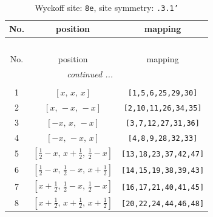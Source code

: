 \documentclass[fleqn,8pt]{jsarticle}
\begin{document}
\begin{longtable}{ccc}
\caption{Wyckoff site: {\tt 8e}, site symmetry: {\tt .3.1'}}
 \\
 \hline \hline
No. & position & mapping \\ \hline \endfirsthead

\multicolumn{2}{l}{\tablename\ \thetable{}} \\
 \hline \hline
No. & position & mapping \\ \hline \endhead

 \hline \hline
\multicolumn{2}{r}{\footnotesize\it continued ...} \\ \endfoot

 \hline \hline
\multicolumn{2}{r}{} \\ \endlastfoot

1 & $\left[ x,\, x,\, x \right]$ & {\tt [1,5,6,25,29,30]} \\ \hline
2 & $\left[ x,\, - x,\, - x \right]$ & {\tt [2,10,11,26,34,35]} \\ \hline
3 & $\left[ - x,\, x,\, - x \right]$ & {\tt [3,7,12,27,31,36]} \\ \hline
4 & $\left[ - x,\, - x,\, x \right]$ & {\tt [4,8,9,28,32,33]} \\ \hline
5 & $\left[ \frac{1}{2} - x,\, x + \frac{1}{2},\, \frac{1}{2} - x \right]$ & {\tt [13,18,23,37,42,47]} \\ \hline
6 & $\left[ \frac{1}{2} - x,\, \frac{1}{2} - x,\, x + \frac{1}{2} \right]$ & {\tt [14,15,19,38,39,43]} \\ \hline
7 & $\left[ x + \frac{1}{2},\, \frac{1}{2} - x,\, \frac{1}{2} - x \right]$ & {\tt [16,17,21,40,41,45]} \\ \hline
8 & $\left[ x + \frac{1}{2},\, x + \frac{1}{2},\, x + \frac{1}{2} \right]$ & {\tt [20,22,24,44,46,48]} \\
\end{longtable}
\renewcommand{\arraystretch}{1.2}
\end{document}

